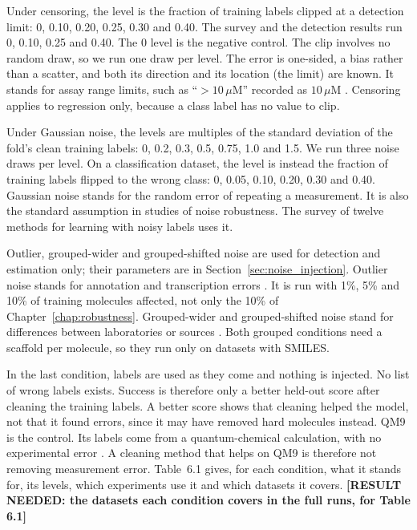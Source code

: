 Under censoring, the level is the fraction of training labels clipped at a detection limit: 0, 0.10, 0.20, 0.25, 0.30 and 0.40. The survey and the detection results run 0, 0.10, 0.25 and 0.40. The 0 level is the negative control. The clip involves no random draw, so we run one draw per level. The error is one-sided, a bias rather than a scatter, and both its direction and its location (the limit) are known. It stands for assay range limits, such as ``$>10\,\mu$M'' recorded as $10\,\mu$M \citep{Svensson2025}. Censoring applies to regression only, because a class label has no value to clip.

Under Gaussian noise, the levels are multiples of the standard deviation of the fold's clean training labels: 0, 0.2, 0.3, 0.5, 0.75, 1.0 and 1.5. We run three noise draws per level. On a classification dataset, the level is instead the fraction of training labels flipped to the wrong class: 0, 0.05, 0.10, 0.20, 0.30 and 0.40. Gaussian noise stands for the random error of repeating a measurement. It is also the standard assumption in studies of noise robustness. The survey of twelve methods for learning with noisy labels uses it.

Outlier, grouped-wider and grouped-shifted noise are used for detection and estimation only; their parameters are in Section~\ref{sec:noise_injection}. Outlier noise stands for annotation and transcription errors \citep{Kalliokoski2013, Hampel2001}. It is run with 1\%, 5\% and 10\% of training molecules affected, not only the 10\% of Chapter~\ref{chap:robustness}. Grouped-wider and grouped-shifted noise stand for differences between laboratories or sources \citep{Bentz2013}. Both grouped conditions need a scaffold per molecule, so they run only on datasets with SMILES.

In the last condition, labels are used as they come and nothing is injected. No list of wrong labels exists. Success is therefore only a better held-out score after cleaning the training labels. A better score shows that cleaning helped the model, not that it found errors, since it may have removed hard molecules instead. QM9 is the control. Its labels come from a quantum-chemical calculation, with no experimental error \citep{Ramakrishnan2014}. A cleaning method that helps on QM9 is therefore not removing measurement error. Table~6.1 gives, for each condition, what it stands for, its levels, which experiments use it and which datasets it covers. \textbf{[RESULT NEEDED: the datasets each condition covers in the full runs, for Table 6.1]}
